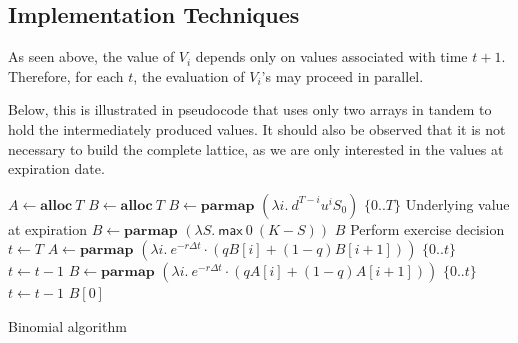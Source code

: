



\subsection{Implementation Techniques}

As seen above, the value of $V_i$ depends only on values associated
with time $t+1$. Therefore, for each $t$, the evaluation of $V_i$'s may
proceed in parallel.

Below, this is illustrated in pseudocode that uses only two arrays in
tandem to hold the intermediately produced values. It should also be
observed that it is not necessary to build the complete lattice, as we
are only interested in the values at expiration date.

\begin{algorithm}

\begin{algorithmic}
  \State $A \gets \mathbf{alloc}\ T$
  \State $B \gets \mathbf{alloc}\ T$
  \State $B \gets \mathbf{parmap}$ $(\lambda i.\ d^{T-i}u^{i}S_0)$ $\{0..T\}$ \Comment Underlying value at expiration
  \State $B \gets \mathbf{parmap}$ $(\lambda S.\ \mathsf{max}\ 0\ (K-S))$ $B$ \Comment Perform exercise decision
  \State $t \gets T$
    \State $A \gets \mathbf{parmap}$ $(\lambda i.\ e^{-r\Delta t} \cdot (qB[i] + (1-q)B[i+1]))$ $\{0..t\}$
    \State $t \gets t-1$
    \State $B \gets \mathbf{parmap}$ $(\lambda i.\ e^{-r\Delta t} \cdot (qA[i] + (1-q)A[i+1]))$ $\{0..t\}$
    \State $t \gets t-1$
  \EndWhile
  \State \Return $B[0]$
\EndFunction
\end{algorithmic}
  
  \caption{Binomial algorithm}
  \label{alg:binomial-algorithm}
\end{algorithm}

